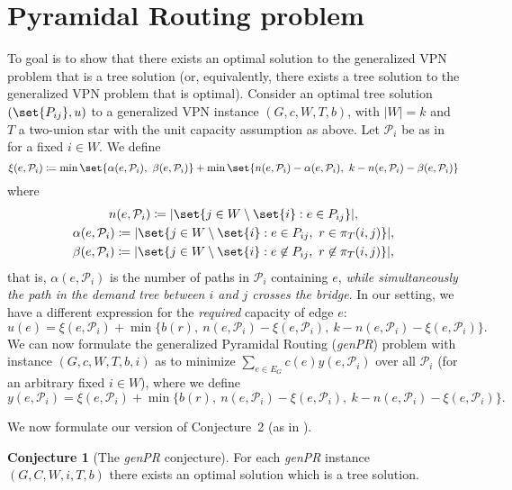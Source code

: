 \documentclass[11pt]{article}
\theoremstyle{definition}
\newtheorem{conjecture}{Conjecture}
\begin{document}
    \section{Pyramidal Routing problem}
    To goal is to show that there exists an optimal solution to the generalized VPN problem that is a tree solution (or, equivalently, there exists a tree solution to the generalized VPN problem that is optimal).
    Consider an optimal tree solution $(\set{P_{ij}}, u)$ to a generalized VPN instance $(G, c, W, T, b)$, with $|W| = k$ and $T$ a two-union star with the unit capacity assumption as above.
    Let $\mathcal P_i$ be as in \cite{grandoni2008short} for a fixed $i \in W$.
    We define
    \[
        \xi(e, \mathcal P_i) \coloneqq \min\set{\alpha(e, \mathcal P_i),\ \beta(e, \mathcal P_i)} + \min\set{n(e, \mathcal P_i) - \alpha(e, \mathcal P_i),\ k - n(e, \mathcal P_i) - \beta(e, \mathcal P_i)}
    \]
    where
    \begin{gather*}
        n(e, \mathcal P_i) \coloneqq |\set{j \in W \setminus \set{i} : e \in P_{ij}}|,\\
        \alpha(e, \mathcal P_i) \coloneqq |\set{j \in W \setminus \set{i} : e \in P_{ij},\ r \in \pi_T(i, j)}|,\\
        \beta(e, \mathcal P_i) \coloneqq |\set{j \in W \setminus \set{i} : e \not\in P_{ij},\ r \not\in \pi_T(i, j)}|,
    \end{gather*}
    that is, $\alpha(e, \mathcal P_i)$ is the number of paths in $\mathcal P_i$ containing $e$, \emph{while simultaneously the path in the demand tree between $i$ and $j$ crosses the bridge}.
    In our setting, we have a different expression for the \emph{required} capacity of edge $e$:
    \[
        u(e) = \xi(e, \mathcal P_i) + \min\Big\{b(r),\ n(e, \mathcal P_i) - \xi(e, \mathcal P_i),\ k - n(e, \mathcal P_i) -  \xi(e, \mathcal P_i)\Big\}.
    \]
    We can now formulate the generalized Pyramidal Routing (\emph{genPR}) problem with instance $(G, c, W, T, b, i)$ as to minimize $\sum_{e \in E_G} c(e) y(e, \mathcal P_i)$ over all $\mathcal P_i$ (for an arbitrary fixed $i \in W$), where we define
    \[
        y(e, \mathcal P_i) = \xi(e, \mathcal P_i) + \min\Big\{b(r),\ n(e, \mathcal P_i) - \xi(e, \mathcal P_i),\ k - n(e, \mathcal P_i) -  \xi(e, \mathcal P_i)\Big\}.
    \]

    We now formulate our version of Conjecture~2 (as in \cite{grandoni2008short}).
    \renewcommand\theconjecture{2}
    \begin{conjecture}[The \emph{genPR} conjecture]
        For each \emph{genPR} instance $(G, C, W, i, T, b)$ there exists an optimal solution which is a tree solution.
    \end{conjecture}
\end{document}
